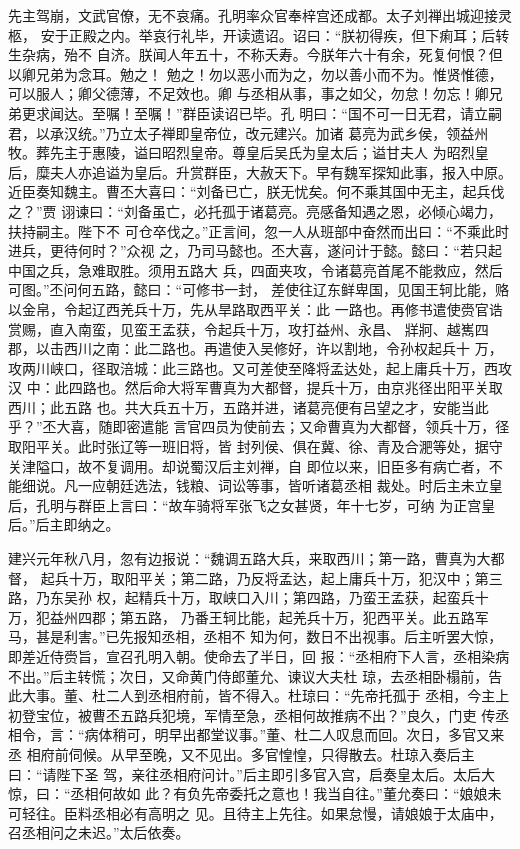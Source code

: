 先主驾崩，文武官僚，无不哀痛。孔明率众官奉梓宫还成都。太子刘禅出城迎接灵柩，
安于正殿之内。举哀行礼毕，开读遗诏。诏曰：“朕初得疾，但下痢耳；后转生杂病，殆不
自济。朕闻人年五十，不称夭寿。今朕年六十有余，死复何恨？但以卿兄弟为念耳。勉之！
勉之！勿以恶小而为之，勿以善小而不为。惟贤惟德，可以服人；卿父德薄，不足效也。卿
与丞相从事，事之如父，勿怠！勿忘！卿兄弟更求闻达。至嘱！至嘱！”群臣读诏已毕。孔
明曰：“国不可一日无君，请立嗣君，以承汉统。”乃立太子禅即皇帝位，改元建兴。加诸
葛亮为武乡侯，领益州牧。葬先主于惠陵，谥曰昭烈皇帝。尊皇后吴氏为皇太后；谥甘夫人
为昭烈皇后，糜夫人亦追谥为皇后。升赏群臣，大赦天下。早有魏军探知此事，报入中原。
近臣奏知魏主。曹丕大喜曰：“刘备已亡，朕无忧矣。何不乘其国中无主，起兵伐之？”贾
诩谏曰：“刘备虽亡，必托孤于诸葛亮。亮感备知遇之恩，必倾心竭力，扶持嗣主。陛下不
可仓卒伐之。”正言间，忽一人从班部中奋然而出曰：“不乘此时进兵，更待何时？”众视
之，乃司马懿也。丕大喜，遂问计于懿。懿曰：“若只起中国之兵，急难取胜。须用五路大
兵，四面夹攻，令诸葛亮首尾不能救应，然后可图。”丕问何五路，懿曰：“可修书一封，
差使往辽东鲜卑国，见国王轲比能，赂以金帛，令起辽西羌兵十万，先从旱路取西平关：此
一路也。再修书遣使赍官诰赏赐，直入南蛮，见蛮王孟获，令起兵十万，攻打益州、永昌、
牂牁、越嶲四郡，以击西川之南：此二路也。再遣使入吴修好，许以割地，令孙权起兵十
万，攻两川峡口，径取涪城：此三路也。又可差使至降将孟达处，起上庸兵十万，西攻汉
中：此四路也。然后命大将军曹真为大都督，提兵十万，由京兆径出阳平关取西川；此五路
也。共大兵五十万，五路并进，诸葛亮便有吕望之才，安能当此乎？”丕大喜，随即密遣能
言官四员为使前去；又命曹真为大都督，领兵十万，径取阳平关。此时张辽等一班旧将，皆
封列侯、俱在冀、徐、青及合淝等处，据守关津隘口，故不复调用。却说蜀汉后主刘禅，自
即位以来，旧臣多有病亡者，不能细说。凡一应朝廷选法，钱粮、词讼等事，皆听诸葛丞相
裁处。时后主未立皇后，孔明与群臣上言曰：“故车骑将军张飞之女甚贤，年十七岁，可纳
为正宫皇后。”后主即纳之。

建兴元年秋八月，忽有边报说：“魏调五路大兵，来取西川；第一路，曹真为大都督，
起兵十万，取阳平关；第二路，乃反将孟达，起上庸兵十万，犯汉中；第三路，乃东吴孙
权，起精兵十万，取峡口入川；第四路，乃蛮王孟获，起蛮兵十万，犯益州四郡；第五路，
乃番王轲比能，起羌兵十万，犯西平关。此五路军马，甚是利害。”已先报知丞相，丞相不
知为何，数日不出视事。后主听罢大惊，即差近侍赍旨，宣召孔明入朝。使命去了半日，回
报：“丞相府下人言，丞相染病不出。”后主转慌；次日，又命黄门侍郎董允、谏议大夫杜
琼，去丞相卧榻前，告此大事。董、杜二人到丞相府前，皆不得入。杜琼曰：“先帝托孤于
丞相，今主上初登宝位，被曹丕五路兵犯境，军情至急，丞相何故推病不出？”良久，门吏
传丞相令，言：“病体稍可，明早出都堂议事。”董、杜二人叹息而回。次日，多官又来丞
相府前伺候。从早至晚，又不见出。多官惶惶，只得散去。杜琼入奏后主曰：“请陛下圣
驾，亲往丞相府问计。”后主即引多官入宫，启奏皇太后。太后大惊，曰：“丞相何故如
此？有负先帝委托之意也！我当自往。”董允奏曰：“娘娘未可轻往。臣料丞相必有高明之
见。且待主上先往。如果怠慢，请娘娘于太庙中，召丞相问之未迟。”太后依奏。

